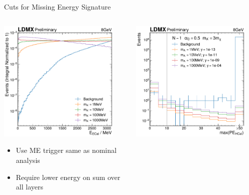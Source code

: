 \documentclass[aspectratio=169]{beamer}
\begin{document}
\begin{frame}[t]{Cuts for Missing Energy Signature}
  \begin{columns}[t]
    \begin{column}{0.32\textwidth}
      \centering
      \includegraphics[width=0.9\textwidth]{../figures/ldmx/analysis/energy-after-trigger-8gev.pdf}
      {
        \footnotesize
        \begin{itemize}
          \item Use ME trigger same as nominal analysis
          \item Require lower energy on sum over all layers
        \end{itemize}
      }
    \end{column}
    \begin{column}{0.32\textwidth}
      \centering
      \includegraphics[width=0.9\textwidth]{../figures/ldmx/analysis/nm1-hcal-max-pe-8gev-1e13norm.pdf}

\end{column}
\end{columns}
\end{frame}
\end{document}
